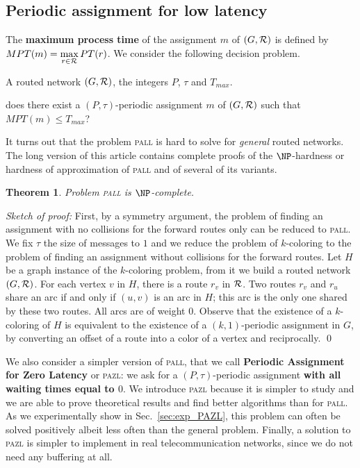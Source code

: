 \documentclass[10pt, conference, letterpaper]{IEEEtran}
\newtheorem{theorem}{Theorem}
\newcommand{\todo}[1]{{\color{red} TODO: {#1}}}
\newcommand\pazl{\textsc{pazl}\xspace}
\newcommand\pall{\textsc{pall}\xspace}
\begin{document}
    
      \subsection{Periodic assignment for low latency}
      
      
    The {\bf maximum process time} of the assignment $m$ of $(G,{\cal R})$ is defined by $MPT(m)=\max\limits_{r \in {\cal R}} PT(r)$. We consider the following decision problem.

      \noindent {\bf Periodic Assignment for Low Latency (\pall)} 

        A routed network $(G,{\cal R})$, the integers $P$, $\tau$ and $T_{max}$.

       does there exist a $(P,\tau)$-periodic assignment $m$ of $(G,{\cal R})$ such that $MPT(m) \leq T_{max}$?

      It turns out that the problem \pall is hard to solve for \emph{general} routed networks. The long version of this article contains complete proofs of the $\NP$-hardness or hardness of approximation of \pall and of several of its variants.

 \begin{theorem}
Problem \pall is $\NP$-complete.
\end{theorem}

\noindent \emph{Sketch of proof:}
 First, by a symmetry argument, the problem of finding an assignment with no collisions for the forward routes only
 can be reduced to \pall.
 We fix $\tau$ the size of messages to $1$ and we reduce the problem of $k$-coloring to the 
 problem of finding an assignment without collisions for the forward routes.
 Let $H$ be a graph instance of the $k$-coloring problem, from it we build a routed network $(G,{\cal R})$. 
 For each vertex $v$ in $H$, there is a route $r_v$ in ${\cal R}$. Two routes $r_v$ and $r_u$ share an arc if and only if $(u,v)$ is an arc in $H$; this arc is the only one shared by these two routes. All arcs are of weight $0$. 
 Observe that the existence of a $k$-coloring of $H$ is equivalent to the existence of a $(k,1)$-periodic assignment in $G$, 
 by converting an offset of a route into a color of a vertex and reciprocally. \qed
     
       We also consider a simpler version of \pall, that we call {\bf Periodic Assignment for Zero Latency} or \pazl: we ask for a $(P,\tau)$-periodic assignment {\bf with all waiting times equal to $0$}. We introduce \pazl because it is simpler to study and we are able to prove theoretical results and find better algorithms than for \pall. As we  experimentally show in Sec.~\ref{sec:exp_PAZL}, this problem can often be solved positively albeit less often than the general problem. Finally, a solution to \pazl is simpler to implement in real telecommunication networks, since we do not need any buffering at all.    
       
\end{document}

